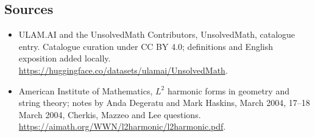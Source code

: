\documentclass[11pt]{article}
\begin{document}
\subsection{Sources}
\begin{itemize}
\item[\hypertarget{source:statement:1}{S1}] ULAM.AI and the UnsolvedMath Contributors, UnsolvedMath, catalogue entry. Catalogue curation under CC BY 4.0; definitions and English exposition added locally.
\url{https://huggingface.co/datasets/ulamai/UnsolvedMath}.
\item[\hypertarget{source:statement:2}{S2}] American Institute of Mathematics, $L^2$ harmonic forms in geometry and string theory; notes by Anda Degeratu and Mark Haskins, March 2004, 17–18 March 2004, Cherkis, Mazzeo and Lee questions.
\url{https://aimath.org/WWN/l2harmonic/l2harmonic.pdf}.
\end{itemize}
\label{end:statement}
\end{document}
